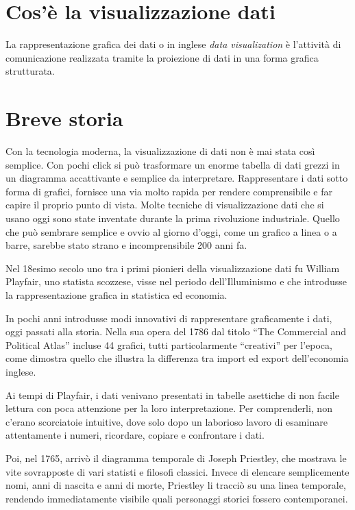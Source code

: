 
\section{Cos'è la visualizzazione dati }
La rappresentazione grafica dei dati o in inglese \emph{data visualization} è l’attività di comunicazione realizzata tramite la proiezione di dati in una forma grafica strutturata.

\section{Breve storia}

Con la tecnologia moderna, la visualizzazione di dati non è mai stata così semplice.
Con pochi click si può trasformare un enorme tabella di dati grezzi in un diagramma accattivante e semplice da interpretare.
Rappresentare i dati sotto forma di grafici, fornisce una via molto rapida per rendere comprensibile e far capire il proprio punto di vista.
Molte tecniche di visualizzazione dati che si usano oggi sono state inventate durante la prima rivoluzione industriale.
Quello che può sembrare semplice e ovvio al giorno d’oggi, come un grafico a linea o a barre, sarebbe stato strano e incomprensibile 200 anni fa.


\noindent Nel 18esimo secolo uno tra i primi pionieri della visualizzazione dati fu William Playfair, uno statista scozzese, visse nel periodo dell’Illuminismo e che introdusse la rappresentazione grafica in statistica ed economia.

\noindent In pochi anni introdusse modi innovativi di rappresentare graficamente i dati, oggi passati alla storia. Nella sua opera del 1786 dal titolo “The Commercial and Political Atlas” incluse 44 grafici, tutti particolarmente “creativi” per l’epoca, come dimostra quello che illustra la differenza tra import ed export dell’economia inglese.

\noindent Ai tempi di Playfair, i dati venivano presentati in tabelle asettiche di non facile lettura con poca attenzione per la loro interpretazione. Per comprenderli, non c’erano scorciatoie intuitive, dove solo dopo un laborioso lavoro di esaminare attentamente i numeri, ricordare, copiare e confrontare i dati.

\noindent Poi, nel 1765, arrivò il diagramma temporale di Joseph Priestley, che mostrava le vite sovrapposte di vari statisti e filosofi classici. Invece di elencare semplicemente nomi, anni di nascita e anni di morte, Priestley li tracciò su una linea temporale, rendendo immediatamente visibile quali personaggi storici fossero contemporanei.


